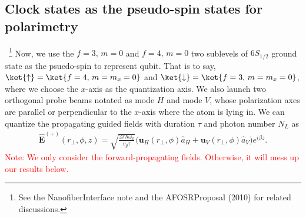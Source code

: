 \documentclass[]{report}
\begin{document}
\subsection{Clock states as the pseudo-spin states for polarimetry}~\footnote{See the NanofiberInterface note and the AFOSRProposal (2010) for related discussions.}
Now, we use the $ f=3,\,m=0 $ and $ f=4,\,m=0 $ two sublevels of $ 6S_{1/2} $ ground state as the psuedo-spin to represent qubit. That is to say, $ \ket{\uparrow}=\ket{f=4,\,m=m_x=0} $ and $ \ket{\downarrow}=\ket{f=3,\,m=m_x=0} $, where we choose the $ x $-axis as the quantization axis. We also launch two orthogonal probe beams notated as mode $ H $ and mode $ V $, whose polarization axes are parallel or perpendicular to the $ x $-axis where the atom is lying in. We can quantize the propagating guided fields with duration $ \tau $ and photon number $ N_L $ as
\begin{align} \label{Eq::FiberModeFunctions}
		\hat{\mathbf{E}}^{(+)}(r\!_\perp,\phi,z) = \sqrt{ \frac{2 \pi \hbar \omega_0}{ v_g \tau} } \big( \mathbf{u}_H(r\!_\perp,\phi) \hat{a}_H + \mathbf{u}_V(r\!_\perp,\phi) \hat{a}_V \big) e^{i \beta z}.
\end{align}
\textcolor{red}{Note: We only consider the forward-propagating fields. Otherwise, it will mess up our results below.}
\end{document}
